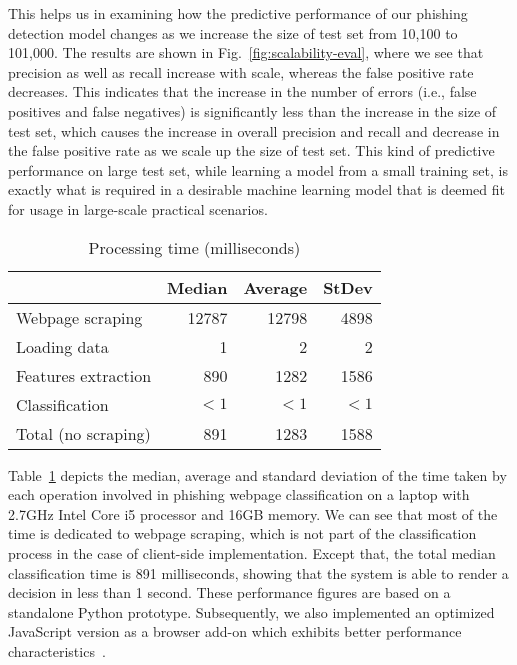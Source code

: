 \documentclass[10pt,conference,compsocconf,letterpaper]{IEEEtran}
\begin{document}
\iffullversion
This helps us in examining how the predictive performance of our phishing detection model changes as we increase the size of test set from 10,100 to 101,000. 
\fi
The results are shown in Fig.~\ref{fig:scalability-eval}, where we see that precision as well as recall increase with scale, whereas the false positive rate decreases. This indicates that the increase in the number of errors (i.e., false positives and false negatives) is significantly less than the increase in the size of test set, which causes the increase in overall precision and recall and decrease in the false positive rate as we scale up the size of test set. This kind of predictive performance on large test set, while learning a model from a small training set,  is exactly what is required in a desirable machine learning model that is deemed fit for usage in large-scale practical scenarios. 

\begin{table}[tbh]
\centering
\begin{tabular}{l r r r}

 & \textbf{Median} & \textbf{Average} & \textbf{StDev} \\ \hline
Webpage scraping & 12787 & 12798 & 4898 \\
Loading data & 1 & 2 & 2 \\ 
Features extraction & 890 & 1282 & 1586 \\ 
Classification & $<1$ & $<1$ & $<1$ \\ \hline
Total (no scraping) & 891 & 1283 & 1588

\end{tabular}
\caption{Processing time (milliseconds)}
\label{tab:time}
\end{table}

Table~\ref{tab:time} depicts the median, average and standard deviation of the time taken by each operation involved in phishing webpage classification on a laptop with 2.7GHz Intel Core i5 processor and 16GB memory. We can see that most of the time is dedicated to webpage scraping, which is not part of the classification process in the case of client-side implementation. Except that, the total median classification time is 891 milliseconds, showing that the system is able to render a decision in less than 1 second. These performance figures are based on a standalone Python prototype. Subsequently, we also implemented an optimized JavaScript version as a browser add-on which exhibits better performance characteristics~\cite{armano:2016:real}.
\end{document}
